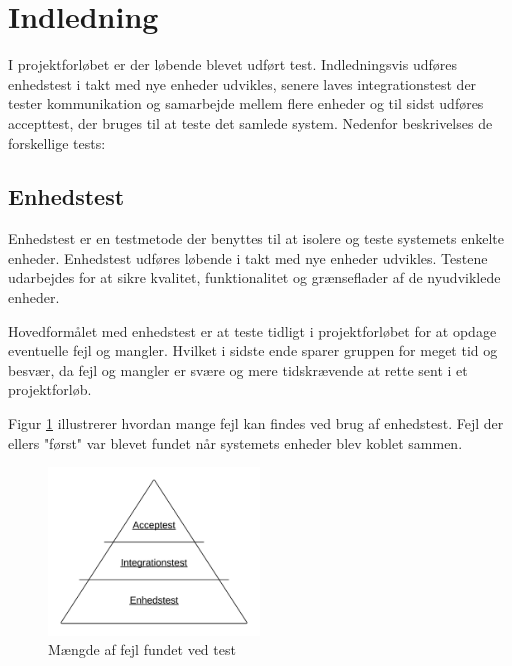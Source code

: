 \section{Indledning}

I projektforløbet er der løbende blevet udført test. Indledningsvis udføres enhedstest i takt med nye enheder udvikles, senere laves integrationstest der tester kommunikation og samarbejde mellem flere enheder og til sidst udføres accepttest, der bruges til at teste det samlede system. Nedenfor beskrivelses de forskellige tests:


\subsection{Enhedstest} 
\vspace{-0.5cm}
Enhedstest er en testmetode der benyttes til at isolere og teste systemets enkelte enheder. Enhedstest udføres løbende i takt med nye enheder udvikles. Testene udarbejdes for at sikre kvalitet, funktionalitet og grænseflader af de nyudviklede enheder. 

Hovedformålet med enhedstest er at teste tidligt i projektforløbet for at opdage eventuelle fejl og mangler. Hvilket i sidste ende sparer gruppen for meget tid og besvær, da fejl og mangler er svære og mere tidskrævende at rette sent i et projektforløb.

Figur \ref{fig:test_forlob} illustrerer hvordan mange fejl kan findes ved brug af enhedstest. Fejl der ellers "først" var blevet fundet når systemets enheder blev koblet sammen.
\vspace{-0.4cm}
\begin{figure}[H]
	\centering
	\includegraphics[width=0.5\textwidth]{Billeder/Test/forlob.png}
	\vspace{-0.4cm}
	\caption{Mængde af fejl fundet ved test}
	\label{fig:test_forlob}
\end{figure}

\vspace{0.5cm}

